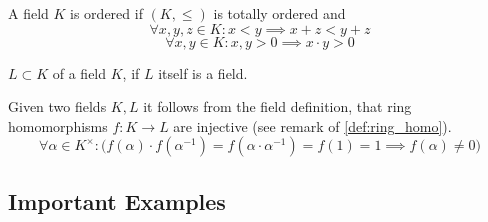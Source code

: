 \begin{definition}
   A field \(K\) is ordered if \((K, \leq)\) is totally ordered and
   \[\forall x, y, z \in K: x < y \implies x + z < y + z\]
   \[\forall x, y \in K: x, y > 0 \implies x \cdot y > 0\]
\end{definition}

\begin{definition}[Subfield]
   \(L \subset K\) of a field \(K\), if \(L\) itself is a field.
\end{definition}

Given two fields \(K, L\) it follows from the field definition, that ring homomorphisms \(f: K \to L\) are injective (see remark of \cref{def:ring_homo}).
\[\forall \alpha \in K^\times: \big(f(\alpha) \cdot f(\alpha^{-1}) = f(\alpha \cdot \alpha^{-1}) = f(1) = 1 \implies f(\alpha) \neq 0\big)\]

\subsection{Important Examples}
